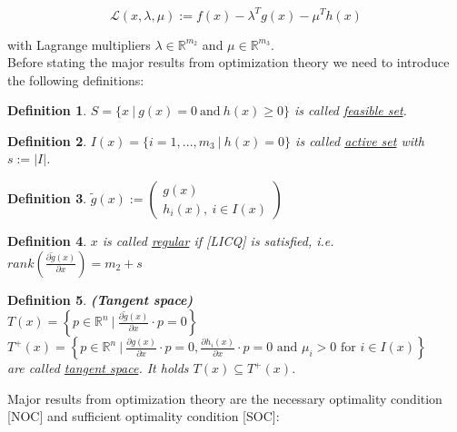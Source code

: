 \documentclass{scrartcl}[12pt, halfparskip]
\newtheorem{Definition}{Definition}
\begin{document}
\begin{equation}
	\mathcal{L}(x,\lambda,\mu) := f(x) - \lambda^T g(x) - \mu^T h(x)
\end{equation}

with Lagrange multipliers $\lambda \in \mathbb{R}^{m_2}$ and $\mu \in \mathbb{R}^{m_3}$. \\

Before stating the major results from optimization theory we need to introduce the following definitions:

\begin{Definition}
	$S = \{ x \ | \ g(x) = 0 \ \text{and} \ h(x) \ge 0 \}$ is called \underline{feasible set}.
\end{Definition}

\begin{Definition}
	$I(x) = \{ i=1,...,m_3 \ | \ h(x) = 0 \}$ is called \underline{active set} with $s := \vert I \vert$.
\end{Definition}

\begin{Definition}
	$\tilde{g}(x) := 
	\begin{pmatrix}
		g(x) \\
		h_i(x), \ i \in I(x) 
	\end{pmatrix}$
\end{Definition}

\begin{Definition}
	$x$ is called \underline{regular} if [LICQ] is satisfied, i.e. $rank \left( \frac{\partial \tilde g(x)}{\partial x} \right) = m_2 + s$
\end{Definition}

\begin{Definition}
	\textbf{(Tangent space)} \\
	$T(x) = \left\{ p \in \mathbb{R}^n \ | \ \frac{\partial \tilde g(x)}{\partial x} \cdot p = 0 \right\}$ \\
	$T^+(x) = \left\{ p \in \mathbb{R}^n \ | \ \frac{\partial g(x)}{\partial x} \cdot p = 0, \frac{\partial h_i(x)}{\partial x} \cdot p = 0 \text{ and } \mu_i > 0 \text{ for } i \in I(x) \right\}$ \\
	are called \underline{tangent space}. It holds $T(x) \subseteq T^+(x)$.
\end{Definition}



Major results from optimization theory are the necessary optimality condition [NOC] and sufficient optimality condition [SOC]: 
\end{document}
